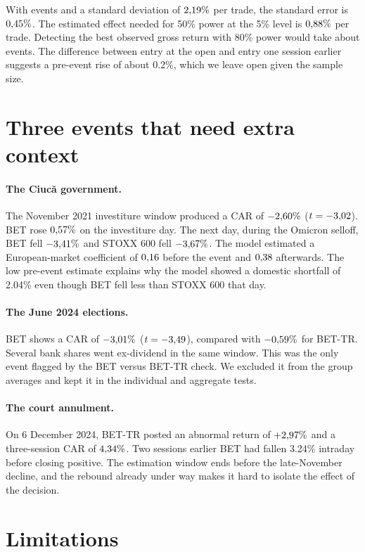 \documentclass[11pt,a4paper]{article}
\begin{document}
With \NPower{} events and a standard deviation of $2{,}19\%$ per trade,
the standard error is $0{,}45\%$. The estimated effect needed for 50\%
power at the 5\% level is $0{,}88\%$ per trade. Detecting the best observed
gross return with 80\% power would take about \NNeed{} events. The difference
between entry at the open and entry one session earlier suggests a pre-event
rise of about 0.2\%, which we leave open given the sample size.

\section{Three events that need extra context}\label{sec:masurari}

\paragraph{The Ciucă government.}
The November 2021 investiture window produced a CAR of $-2{,}60\%$
($t=-3{,}02$). BET rose $0{,}57\%$ on the investiture day.
The next day, during the Omicron selloff, BET fell $-3{,}41\%$ and STOXX
600 fell $-3{,}67\%$. The model estimated a European-market coefficient
of $0{,}16$ before the event and $0{,}38$ afterwards. The low
pre-event estimate explains why the model showed a domestic shortfall of
2.04\% even though BET fell less than STOXX 600 that day.

\paragraph{The June 2024 elections.}
BET shows a CAR of $-3{,}01\%$ ($t=-3{,}49$), compared with $-0{,}59\%$
for BET-TR. Several bank shares went ex-dividend in the same window. This
was the only event flagged by the BET versus BET-TR check. We excluded it
from the group averages and kept it in the individual and aggregate tests.

\paragraph{The court annulment.}
On 6 December 2024, BET-TR posted an abnormal return of $+2{,}97\%$ and
a three-session CAR of $4{,}34\%$. Two sessions earlier BET had fallen
3.24\% intraday before closing positive. The estimation window ends before
the late-November decline, and the rebound already under way makes it hard
to isolate the effect of the decision.

\section{Limitations}
\end{document}
